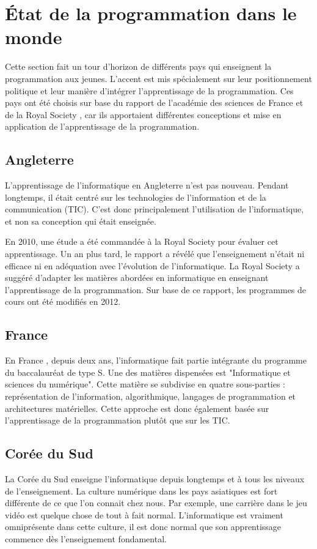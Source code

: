 \section{État de la programmation dans le monde}
\label{monde}
Cette section fait un tour d'horizon de différents pays qui enseignent la programmation aux jeunes. L'accent est mis spécialement sur leur positionnement politique et leur manière d'intégrer l'apprentissage de la programmation. Ces pays ont été choisis sur base du rapport de l'académie des sciences de France \cite{ens-info-fr} et de la Royal Society \cite{comput-school}, car ils apportaient différentes conceptions et mise en application de l'apprentissage de la programmation.

\subsection{Angleterre}
L'apprentissage de l'informatique en Angleterre \cite{status-guid} n'est pas nouveau. Pendant longtemps, il était centré sur les technologies de l'information et de la communication (TIC). C'est donc principalement l'utilisation de l'informatique, et non sa conception qui était enseignée.

En 2010, une étude a été commandée à la Royal Society pour évaluer cet apprentissage. Un an plus tard, le rapport a révélé que l'enseignement n'était ni efficace ni en adéquation avec l'évolution de l'informatique. La Royal Society a suggéré d'adapter les matières abordées en informatique en enseignant l'apprentissage de la programmation. Sur base de ce rapport, les programmes de cours ont été modifiés en 2012.

\subsection{France}
En France \cite{wiki-info-et-sc-du-num} \cite{wiki-bac-sc}, depuis deux ans, l'informatique fait partie intégrante du programme du baccalauréat de type S. Une des matières dispensées est "Informatique et sciences du numérique". Cette matière se subdivise en quatre sous-parties : représentation de l'information, algorithmique, langages de programmation et architectures matérielles. Cette approche est donc également basée sur l'apprentissage de la programmation plutôt que sur les TIC.

\subsection{Corée du Sud}
La Corée du Sud enseigne l'informatique depuis longtemps et à tous les niveaux de l'enseignement. La culture numérique dans les pays asiatiques est fort différente de ce que l'on connait chez nous. Par exemple, une carrière dans le jeu vidéo est quelque chose de tout à fait normal. L'informatique est vraiment omniprésente dans cette culture, il est donc normal que son apprentissage commence dès l'enseignement \gls{fondamental}.


